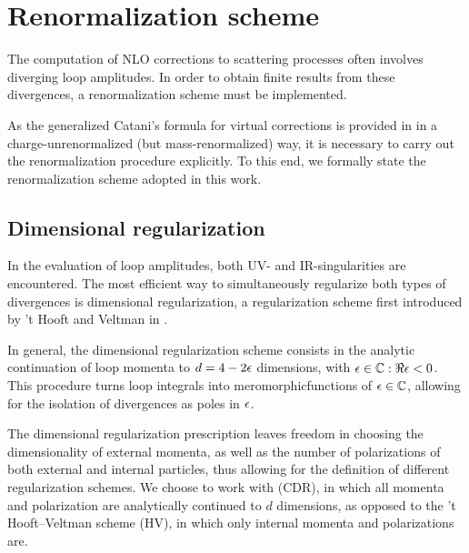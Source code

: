 
\section{Renormalization scheme}

The computation of NLO corrections to scattering processes often involves diverging loop amplitudes. In order to obtain finite results from these divergences, a renormalization scheme must be implemented.

As the generalized Catani's formula for virtual corrections is provided in \cite{Catani-2001} in a charge-unrenormalized (but mass-renormalized) way, it is necessary to carry out the renormalization procedure explicitly. To this end, we formally state the renormalization scheme adopted in this work.

\subsection{Dimensional regularization}

In the evaluation of loop amplitudes, both UV- and IR-singularities are encountered. The most efficient way to simultaneously regularize both types of divergences is dimensional regularization, a regularization scheme first introduced by 't Hooft and Veltman in \cite{thooft-1972}.

In general, the dimensional regularization scheme consists in the analytic continuation of loop momenta to $ d = 4 - 2 \epsilon $ dimensions, with $ \epsilon \in \mathbb{C} : \Re\epsilon < 0 $. This procedure turns loop integrals into meromorphic\footnotemark functions of $ \epsilon \in \mathbb{C} $, allowing for the isolation of divergences as poles in $ \epsilon $.


The dimensional regularization prescription leaves freedom in choosing the dimensionality of external momenta, as well as the number of polarizations of both external and internal particles, thus allowing for the definition of different regularization schemes. We choose to work with  (CDR), in which all momenta and polarization are analytically continued to $ d $ dimensions, as opposed to the 't Hooft--Veltman scheme (HV), in which only internal momenta and polarizations are.

